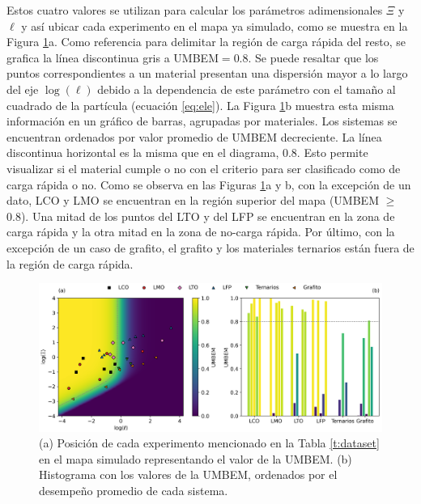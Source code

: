 Estos cuatro valores se utilizan para calcular los parámetros adimensionales 
$\Xi$ y $\ell$ y así ubicar cada experimento en el mapa ya simulado, como se muestra
en la Figura \ref{fig:UMBEM}a. Como referencia para delimitar la región de carga
rápida del resto, se grafica la línea discontinua gris a UMBEM$ = 0.8$. Se puede
resaltar que los puntos correspondientes a un material presentan una 
dispersión mayor a lo largo del eje $\log(\ell)$ debido a la dependencia de este
parámetro con el tamaño al cuadrado de la partícula (ecuación \ref{eq:ele}). La
Figura \ref{fig:UMBEM}b muestra esta misma información en un gráfico de barras,
agrupadas por materiales. Los sistemas se encuentran ordenados por valor promedio 
de UMBEM decreciente. La línea discontinua horizontal es la misma que
en el diagrama, 0.8. Esto permite visualizar si el material cumple o no con el
criterio para ser clasificado como de carga rápida o no. Como se observa en las
Figuras \ref{fig:UMBEM}a y b, con la excepción de un dato, LCO y LMO se encuentran
en la región superior del mapa (UMBEM $\geq$ 0.8). Una mitad de los puntos del 
LTO y del LFP se encuentran en la zona de carga rápida y la otra mitad en la zona
de no-carga rápida. Por último, con la excepción de un caso de grafito, el grafito
y los materiales ternarios están fuera de la región de carga rápida.

\begin{figure}[h!]
    \centering
    \includegraphics[width=\textwidth]{FastCharging/umbem/UMBEM.png}
    \caption{(a) Posición de cada experimento mencionado en la Tabla 
    \ref{t:dataset} en el mapa simulado representando el valor de la UMBEM. (b)
    Histograma con los valores de la UMBEM, ordenados por el desempeño promedio
    de cada sistema.}
    \label{fig:UMBEM}
\end{figure}


